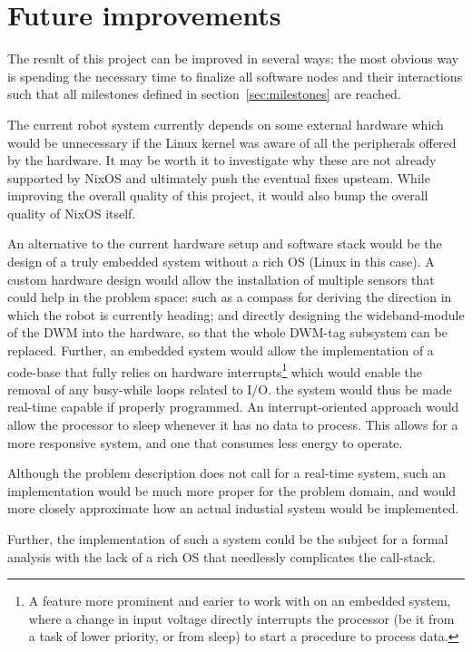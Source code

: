 \section{Future improvements}
The result of this project can be improved in several ways: the most
obvious way is spending the necessary time to finalize all software
nodes and their interactions such that all milestones defined in
section~\ref{sec:milestones} are reached.

The current robot system currently depends on some external hardware
which would be unnecessary if the Linux kernel was aware of all the
peripherals offered by the hardware. It may be worth it to investigate
why these are not already supported by NixOS and ultimately push the
eventual fixes upsteam. While improving the overall quality of this
project, it would also bump the overall quality of NixOS itself.

An alternative to the current hardware setup and software stack would be
the design of a truly embedded system without a rich OS (Linux in this
case). A custom hardware design would allow the installation of multiple
sensors that could help in the problem space: such as a compass for
deriving the direction in which the robot is currently heading; and
directly designing the wideband-module of the DWM into the hardware, so
that the whole DWM-tag subsystem can be replaced. Further, an embedded
system would allow the implementation of a code-base that fully relies
on hardware interrupts\footnote{A feature more prominent and earier to
  work with on an embedded system, where a change in input voltage
  directly interrupts the processor (be it from a task of lower
  priority, or from sleep) to start a procedure to process data.} which
would enable the removal of any busy-while loops related to I/O. the
system would thus be made real-time capable if properly programmed. An
interrupt-oriented approach would allow the processor to sleep whenever
it has no data to process. This allows for a more responsive system, and
one that consumes less energy to operate.

Although the problem description does not call for a real-time system,
such an implementation would be much more proper for the problem domain,
and would more closely approximate how an actual industial system would
be implemented.

Further, the implementation of such a system could be the subject for a
formal analysis with the lack of a rich OS that needlessly complicates
the call-stack.

